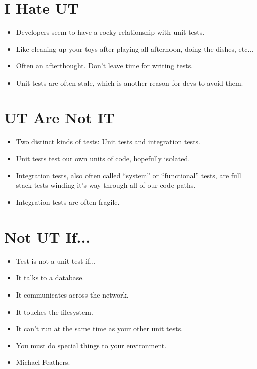 \documentclass{article}
\begin{document}
\newpage
\section{I Hate UT}
\begin{itemize}
    \item Developers seem to have a rocky relationship with unit tests.
    \item Like cleaning up your toys after playing all afternoon, doing the
        dishes, etc...
    \item Often an afterthought. Don't leave time for writing tests.
    \item Unit tests are often stale, which is another reason for devs to avoid
        them.
\end{itemize}

\newpage
\section{UT Are Not IT}
\begin{itemize}
    \item Two distinct kinds of tests: Unit tests and integration tests.
    \item Unit tests test our own units of code, hopefully isolated.
    \item Integration tests, also often called ``system'' or ``functional''
        tests, are full stack tests winding it's way through all of our code
        paths.
    \item Integration tests are often fragile.
\end{itemize}

\newpage
\section{Not UT If...}
\begin{itemize}
    \item Test is not a unit test if...
    \item It talks to a database.
    \item It communicates across the network.
    \item It touches the filesystem.
    \item It can't run at the same time as your other unit tests.
    \item You must do special things to your environment.
    \item Michael Feathers.
\end{itemize}
\end{document}

